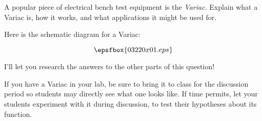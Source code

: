 

A popular piece of electrical bench test equipment is the {\it Variac}.  Explain what a Variac is, how it works, and what applications it might be used for.







Here is the schematic diagram for a Variac:

$$\epsfbox{03220x01.eps}$$

I'll let you research the answers to the other parts of this question!







If you have a Variac in your lab, be sure to bring it to class for the discussion period so students may directly see what one looks like.  If time permits, let your students experiment with it during discussion, to test their hypotheses about its function.




